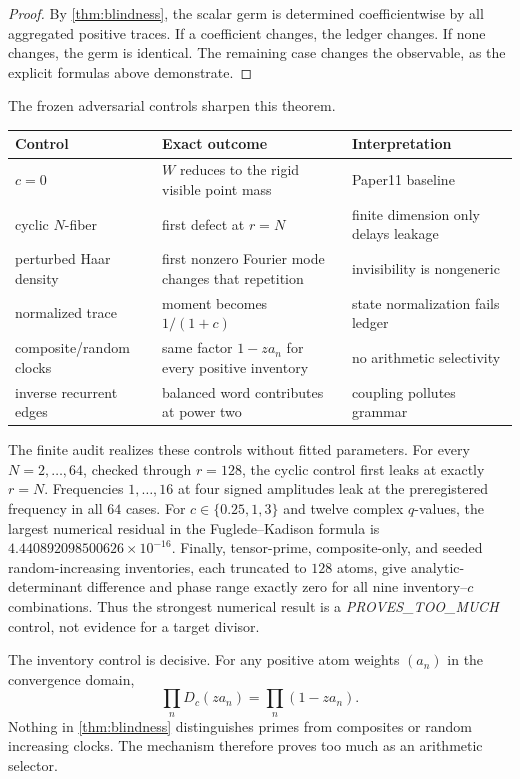 \begin{proof}
By \cref{thm:blindness}, the scalar germ is determined coefficientwise by
all aggregated positive traces.  If a coefficient changes, the ledger
changes.  If none changes, the germ is identical.  The remaining case changes
the observable, as the explicit formulas above demonstrate.
\end{proof}

The frozen adversarial controls sharpen this theorem.
\begin{center}\small
\begin{tabularx}{0.98\textwidth}{L{0.22\textwidth}X L{0.24\textwidth}}
\toprule
Control & Exact outcome & Interpretation\\\midrule
$c=0$ & $W$ reduces to the rigid visible point mass & Paper11 baseline\\
cyclic $N$-fiber & first defect at $r=N$ & finite dimension only delays leakage\\
perturbed Haar density & first nonzero Fourier mode changes that repetition & invisibility is nongeneric\\
normalized trace & moment becomes $1/(1+c)$ & state normalization fails ledger\\
composite/random clocks & same factor $1-za_n$ for every positive inventory & no arithmetic selectivity\\
inverse recurrent edges & balanced word contributes at power two & coupling pollutes grammar\\
\bottomrule
\end{tabularx}
\end{center}

The finite audit realizes these controls without fitted parameters.  For
every $N=2,\ldots,64$, checked through $r=128$, the cyclic control first leaks
at exactly $r=N$.  Frequencies $1,\ldots,16$ at four signed amplitudes leak at
the preregistered frequency in all $64$ cases.  For
$c\in\{0.25,1,3\}$ and twelve complex $q$-values, the largest numerical
residual in the Fuglede--Kadison formula is
$4.440892098500626\times10^{-16}$.  Finally, tensor-prime, composite-only,
and seeded random-increasing inventories, each truncated to $128$ atoms,
give analytic-determinant difference and phase range exactly zero for all
nine inventory--$c$ combinations.  Thus the strongest numerical result is a
\emph{PROVES\_TOO\_MUCH} control, not evidence for a target divisor.

The inventory control is decisive.  For any positive atom weights $(a_n)$ in
the convergence domain,
\[
 \prod_nD_c(za_n)=\prod_n(1-za_n).                          \tag{5.4}
\]
Nothing in \cref{thm:blindness} distinguishes primes from composites or
random increasing clocks.  The mechanism therefore proves too much as an
arithmetic selector.
